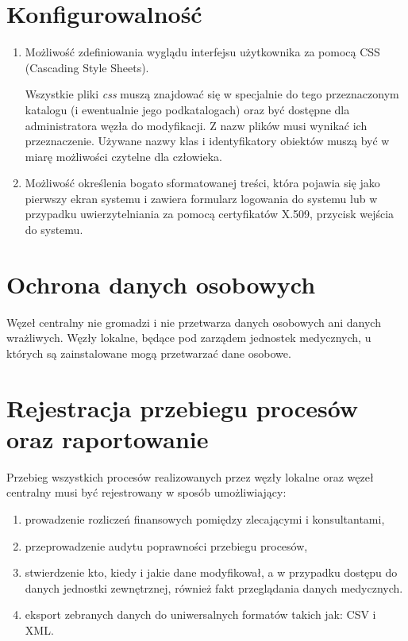 \documentclass[a4paper]{report}
\begin{document}
\section{Konfigurowalność}

\begin{enumerate}
  \item Możliwość zdefiniowania wyglądu interfejsu użytkownika za pomocą CSS (Cascading Style Sheets).

  Wszystkie pliki \emph{css} muszą znajdować się w specjalnie do tego przeznaczonym katalogu (i ewentualnie
  jego podkatalogach) oraz być dostępne dla administratora węzła do modyfikacji. Z nazw plików musi wynikać
  ich przeznaczenie. Używane nazwy klas i identyfikatory obiektów muszą być w miarę możliwości czytelne
  dla człowieka.

  \item Możliwość określenia bogato sformatowanej treści, która pojawia się jako pierwszy ekran systemu
  i zawiera formularz logowania do systemu lub w przypadku uwierzytelniania za pomocą certyfikatów X.509,
  przycisk wejścia do systemu.

\end{enumerate}

\section{Ochrona danych osobowych}

Węzeł centralny nie gromadzi i nie przetwarza danych osobowych ani danych wrażliwych. Węzły lokalne, będące pod zarządem jednostek medycznych, u których są zainstalowane mogą przetwarzać dane osobowe.

\section{Rejestracja przebiegu procesów oraz raportowanie}

Przebieg wszystkich procesów realizowanych przez węzły lokalne oraz węzeł 
centralny musi być rejestrowany w sposób umożliwiający: 
\begin{enumerate}
  \item prowadzenie rozliczeń finansowych pomiędzy zlecającymi i konsultantami,
  \item przeprowadzenie audytu poprawności przebiegu procesów,
  \item stwierdzenie kto, kiedy i jakie dane modyfikował, a w przypadku dostępu do danych
  jednostki zewnętrznej, również fakt przeglądania danych medycznych.
  \item eksport zebranych danych do uniwersalnych formatów takich jak: CSV i XML.
\end{enumerate}
\end{document}
